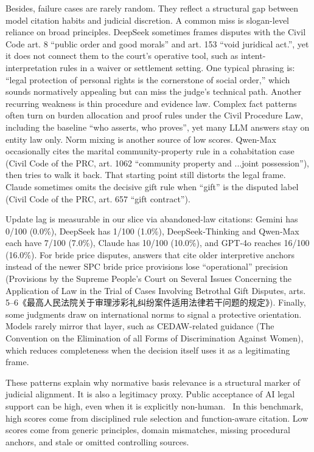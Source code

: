 Besides, failure cases are rarely random. They reflect a structural gap between model citation habits and judicial discretion. A common miss is slogan-level reliance on broad principles. DeepSeek sometimes frames disputes with the Civil Code art. 8 ``public order and good morals'' and art. 153 ``void juridical act.'', yet it does not connect them to the court's operative tool, such as intent-interpretation rules in a waiver or settlement setting. One typical phrasing is: ``legal protection of personal rights is the cornerstone of social order,'' which sounds normatively appealing but can miss the judge's technical path. Another recurring weakness is thin procedure and evidence law. Complex fact patterns often turn on burden allocation and proof rules under the Civil Procedure Law, including the baseline ``who asserts, who proves'', yet many LLM answers stay on entity law only. Norm mixing is another source of low scores. Qwen-Max occasionally cites the marital community-property rule in a cohabitation case (Civil Code of the PRC, art. 1062 ``community property and ...joint possession''), then tries to walk it back. That starting point still distorts the legal frame. Claude sometimes omits the decisive gift rule when ``gift'' is the disputed label (Civil Code of the PRC, art. 657 ``gift contract'').

Update lag is measurable in our slice via abandoned-law citations: Gemini has 0/100 (0.0\%), DeepSeek has 1/100 (1.0\%), DeepSeek‑Thinking and Qwen‑Max each have 7/100 (7.0\%), Claude has 10/100 (10.0\%), and GPT‑4o reaches 16/100 (16.0\%). For bride price disputes, answers that cite older interpretive anchors instead of the newer SPC bride price provisions lose ``operational'' precision (Provisions by the Supreme People's Court on Several Issues Concerning the Application of Law in the Trial of Cases Involving Betrothal Gift Disputes, arts. 5--6《最高人民法院关于审理涉彩礼纠纷案件适用法律若干问题的规定》). Finally, some judgments draw on international norms to signal a protective orientation. Models rarely mirror that layer, such as CEDAW-related guidance (The Convention on the Elimination of all Forms of Discrimination Against Women), which reduces completeness when the decision itself uses it as a legitimating frame.

These patterns explain why normative basis relevance is a structural marker of judicial alignment. It is also a legitimacy proxy. Public acceptance of AI legal support can be high, even when it is explicitly non-human.~\cite{ref96} In this benchmark, high scores come from disciplined rule selection and function-aware citation. Low scores come from generic principles, domain mismatches, missing procedural anchors, and stale or omitted controlling sources.

